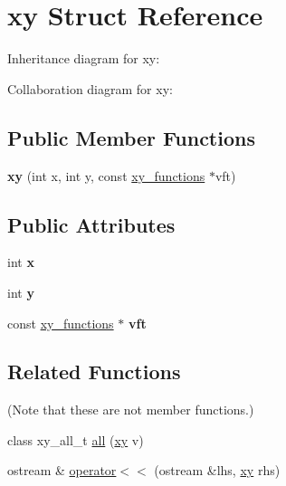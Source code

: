 \hypertarget{structxy}{}\section{xy Struct Reference}
\label{structxy}


Inheritance diagram for xy\+:


Collaboration diagram for xy\+:
\subsection*{Public Member Functions}
\begin{DoxyCompactItemize}
\item 
\mbox{\label{structxy_a3fd5d328922f5ec57d96780beaf13fae}} 
{\bfseries xy} (int x, int y, const \hyperlink{structxy__functions}{xy\+\_\+functions} $\ast$vft)
\end{DoxyCompactItemize}
\subsection*{Public Attributes}
\begin{DoxyCompactItemize}
\item 
\mbox{\label{structxy_acd933dd71ec45b3f27bb7cbbc8fc7008}} 
int {\bfseries x}
\item 
\mbox{\label{structxy_a1b4e476c8c2757be112c6be285f59ef1}} 
int {\bfseries y}
\item 
\mbox{\label{structxy_aa88d9ef00ebadec59ecd17a59580ce96}} 
const \hyperlink{structxy__functions}{xy\+\_\+functions} $\ast$ {\bfseries vft}
\end{DoxyCompactItemize}
\subsection*{Related Functions}
(Note that these are not member functions.) \begin{DoxyCompactItemize}
\item 
class xy\+\_\+all\+\_\+t \hyperlink{structxy_af0ac2823653fbb02e47de4315fb20a49}{all} (\hyperlink{structxy}{xy} v)
\item 
ostream \& \hyperlink{structxy_a74964e4e0c8376f138add4af02effce6}{operator$<$$<$} (ostream \&lhs, \hyperlink{structxy}{xy} rhs)
\end{DoxyCompactItemize}


